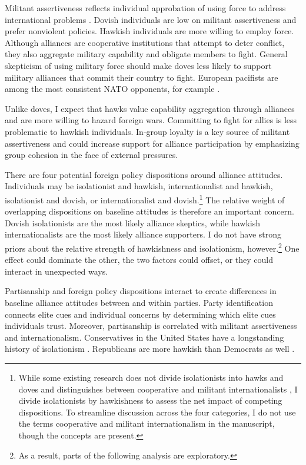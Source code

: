 \documentclass[12pt]{article}
\begin{document}
Militant assertiveness reflects individual approbation of using force to address international problems \citep{Herrmannetal1999}. 
Dovish individuals are low on militant assertiveness and prefer nonviolent policies.
Hawkish individuals are more willing to employ force.
Although alliances are cooperative institutions that attempt to deter conflict, they also aggregate military capability and obligate members to fight.
General skepticism of using military force should make doves less likely to support military alliances that commit their country to fight.  
European pacifists are among the most consistent NATO opponents, for example \citep{Thies2015}.


Unlike doves, I expect that hawks value capability aggregation through alliances and are more willing to hazard foreign wars. 
Committing to fight for allies is less problematic to hawkish individuals. 
In-group loyalty is a key source of militant assertiveness \citep{Kertzeretal2014} and could increase support for alliance participation by emphasizing group cohesion in the face of external pressures.


There are four potential foreign policy dispositions around alliance attitudes.
Individuals may be isolationist and hawkish, internationalist and hawkish, isolationist and dovish, or internationalist and dovish.\footnote{While some existing research does not divide isolationists into hawks and doves and distinguishes between cooperative and militant internationalists \citep{Kertzeretal2014}, I divide isolationists by hawkishness to assess the net impact of competing dispositions. To streamline discussion across the four categories, I do not use the terms cooperative and militant internationalism in the manuscript, though the concepts are present.}
The relative weight of overlapping dispositions on baseline attitudes is therefore an important concern. 
Dovish isolationists are the most likely alliance skeptics, while hawkish internationalists are the most likely alliance supporters. 
I do not have strong priors about the relative strength of hawkishness and isolationism, however.\footnote{As a result, parts of the following analysis are exploratory.}
One effect could dominate the other, the two factors could offset, or they could interact in unexpected ways.


Partisanship and foreign policy dispositions interact to create differences in baseline alliance attitudes between and within parties. 
Party identification connects elite cues and individual concerns by determining which elite cues individuals trust.
Moreover, partisanship is correlated with militant assertiveness and internationalism. 
Conservatives in the United States have a longstanding history of isolationism \citep{Kupchan2020}.
Republicans are more hawkish than Democrats as well \citep{Gries2014}. 
\end{document}
